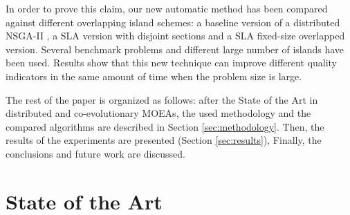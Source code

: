 \documentclass[preprint]{elsarticle}
\begin{document}
In order to prove this claim, our new automatic method has been
compared against different overlapping island schemes: a
baseline version of a distributed NSGA-II \citep{Deb00NSGAII}, a
SLA version with disjoint sections and a SLA
fixed-size overlapped version. 
Several benchmark problems and different large number of islands
have been used. Results show that this new technique can improve
different quality indicators in the same amount of time when the
problem size is large.  

The rest of the paper is organized as follows: after the State of the Art in distributed and co-evolutionary MOEAs, 
the used methodology and the compared algorithms are described in Section \ref{sec:methodology}. 
Then, the results of the experiments are presented (Section \ref{sec:results}), Finally, the conclusions and future work are discussed.


%
\section{State of the Art}
\label{sec:soa}
\end{document}
